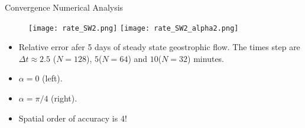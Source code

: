 \documentclass[11pt]{beamer}
\begin{document}
%

\begin{frame}{Convergence Numerical Analysis}
\begin{figure}
\texttt{[image: rate\_SW2.png]}
\texttt{[image: rate\_SW2\_alpha2.png]}
\end{figure}
\begin{itemize}
\item Relative error afer 5 days of steady state geostrophic flow. The times step are $\Delta t \approx 2.5$ ($N=128$), $5$($N=64$) and $10$($N=32$) minutes.
\item $\alpha = 0$ (left).
\item $\alpha = \pi/4$ (right).
\item Spatial order of accuracy is 4!
\end{itemize}
\end{frame}
\end{document}
